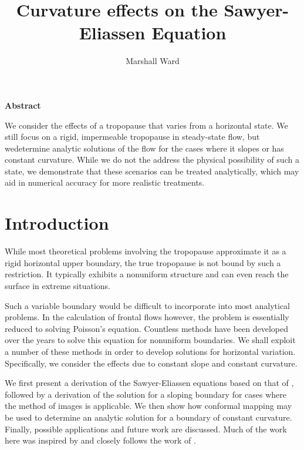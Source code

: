 \documentclass[11pt,onecolumn,oneside]{article}
\title{Curvature effects on the Sawyer-Eliassen Equation}
\author{Marshall Ward}
\begin{document}
\maketitle

\begin{center}{\large \bf Abstract}\end{center}

{\small We consider the effects of a tropopause that varies from a horizontal state. We still focus on a rigid, impermeable tropopause in steady-state flow, but wedetermine analytic solutions of the flow for the cases where it slopes or has constant curvature. While we do not the address the physical possibility of such a state, we demonstrate that these scenarios can be treated analytically, which may aid in numerical accuracy for more realistic treatments.}

\section{Introduction}

While most theoretical problems involving the tropopause approximate it as a rigid horizontal upper boundary, the true tropopause is not bound by such a restriction. It typically exhibits a nonuniform structure and can even reach the surface in extreme situations.

Such a variable boundary would be difficult to incorporate into most analytical problems. In the calculation of frontal flows however, the problem is essentially reduced to solving Poisson's equation. Countless methods have been developed over the years to solve this equation for nonuniform boundaries. We shall exploit a number of these methods in order to develop solutions for horizontal variation. Specifically, we consider the effects due to constant slope and constant curvature.

We first present a derivation of the Sawyer-Eliassen equations based on that of \citet{Hoskins:1982}, followed by a derivation of the solution for a sloping boundary for cases where the method of images is applicable. We then show how conformal mapping may be used to determine an analytic solution for a boundary of constant curvature. Finally, possible applications and future work are discussed. Much of the work here was inspired by and closely follows the work of \citet{Hakim+:2001}.

\end{document}
